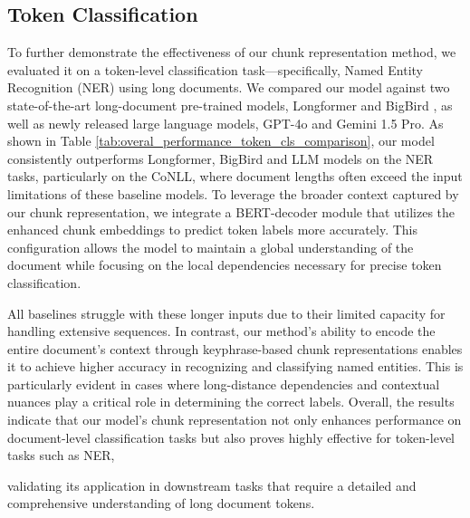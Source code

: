 \documentclass[11pt]{article}
\begin{document}
\subsection{Token Classification}
To further demonstrate the effectiveness of our chunk representation method, we evaluated it on a token-level classification task—specifically, Named Entity Recognition (NER) using long documents. We compared our model against two state-of-the-art long-document pre-trained models, Longformer \citep{beltagy2020longformer} and BigBird \citep{zaheer2020big}, as well as newly released large language models, GPT-4o and Gemini 1.5 Pro. 
As shown in Table \ref{tab:overal_performance_token_cls_comparison}, our model consistently outperforms Longformer, BigBird and LLM models on the NER tasks, particularly on the CoNLL, where document lengths often exceed the input limitations of these baseline models. To leverage the broader context captured by our chunk representation, we integrate a BERT-decoder module that utilizes the enhanced chunk embeddings to predict token labels more accurately. This configuration allows the model to maintain a global understanding of the document while focusing on the local dependencies necessary for precise token classification.

All baselines struggle with these longer inputs due to their limited capacity for handling extensive sequences. In contrast, our method’s ability to encode the entire document’s context through keyphrase-based chunk representations enables it to achieve higher accuracy in recognizing and classifying named entities. This is particularly evident in cases where long-distance dependencies and contextual nuances play a critical role in determining the correct labels.
Overall, the results indicate that our model's chunk representation not only enhances performance on document-level classification tasks but also proves highly effective for token-level tasks such as NER, 

validating its application in downstream tasks that require a detailed and comprehensive understanding of long document tokens.
\end{document}

